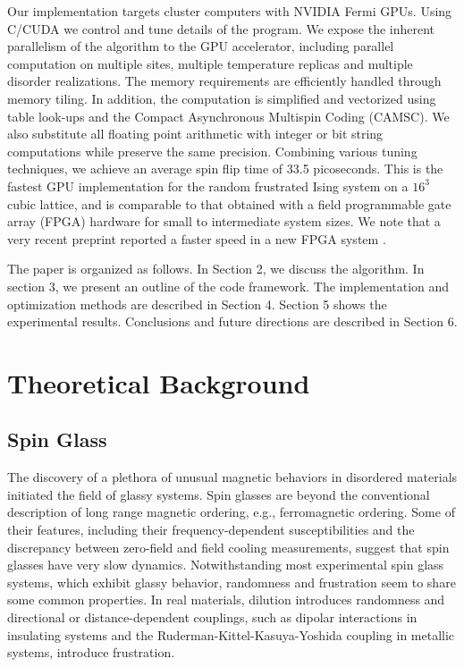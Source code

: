 Our implementation targets cluster computers with NVIDIA Fermi GPUs.
Using C/CUDA we control and tune details of the program.
We expose the inherent parallelism of the algorithm
to the GPU accelerator, including parallel computation on multiple sites, multiple temperature 
replicas and multiple disorder realizations. The memory requirements are efficiently handled through
memory tiling. In addition, the computation is simplified and
vectorized using table look-ups and the Compact Asynchronous
Multispin Coding (CAMSC). We also substitute all floating point arithmetic
with integer or bit string computations while preserve the same
precision. Combining various tuning techniques, we achieve an average
spin flip time of 33.5 picoseconds. This is the fastest GPU
implementation for the random frustrated Ising system on a $16^3$
cubic lattice, and is comparable to that obtained with a field
programmable gate array (FPGA) hardware \cite{2012arXiv1204.4134J} for
small to intermediate system sizes. We note that a very recent preprint reported a faster speed in
a new FPGA system \cite{Janus2-2013}. 

The paper is organized as follows. In Section 2, we discuss the algorithm. In section 3, 
we present an outline of the code framework. The implementation 
and optimization methods are described in Section 4. Section 5 shows the experimental  
results. Conclusions and future directions are described in Section 6. 



\section{Theoretical Background}


\subsection{Spin Glass}

The discovery of a plethora of unusual magnetic behaviors in disordered materials 
initiated the field of glassy systems.\cite{Binder-Young1986} Spin glasses are 
beyond the conventional description of long range magnetic ordering, e.g., 
ferromagnetic ordering. Some of their features, including their frequency-dependent 
susceptibilities and the discrepancy between zero-field and field cooling measurements, 
suggest that spin glasses have very slow dynamics. Notwithstanding most experimental spin 
glass systems, which exhibit glassy behavior, randomness and frustration 
seem to share some common properties. In real materials, 
dilution introduces randomness and directional or distance-dependent couplings, 
such as dipolar interactions in insulating systems and the Ruderman-Kittel-Kasuya-Yoshida 
coupling in metallic systems, introduce frustration. 

